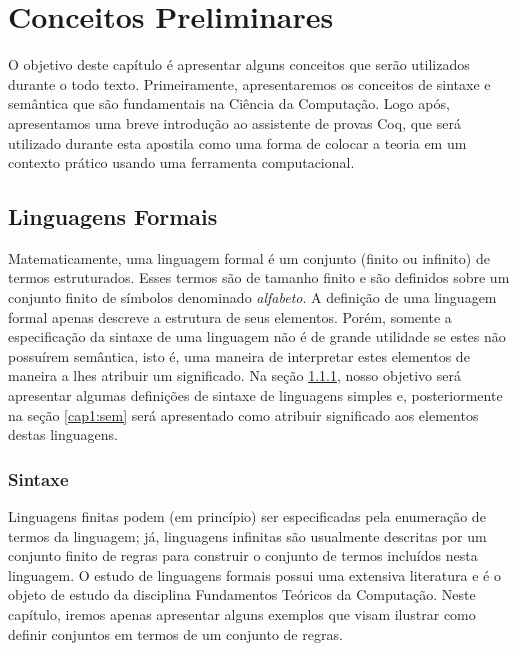 \chapter{Conceitos Preliminares}

O objetivo deste cap\'itulo \'e apresentar alguns conceitos que ser\~ao utilizados durante o todo texto. Primeiramente,
apresentaremos os conceitos de sintaxe e sem\^antica que s\~ao fundamentais na Ci\^encia da Computa\c{c}\~ao. Logo ap\'os,
apresentamos uma breve introdu\c{c}\~ao ao assistente de provas Coq, que ser\'a utilizado durante esta apostila como uma
forma de colocar a teoria em um contexto pr\'atico usando uma ferramenta computacional.

\section{Linguagens Formais}

Matematicamente, uma linguagem formal \'e um conjunto (finito ou infinito) de termos estruturados. Esses
termos s\~ao de tamanho finito e s\~ao definidos sobre um conjunto finito de s\'imbolos denominado \textit{alfabeto}.
A defini\c{c}\~ao de uma linguagem formal apenas descreve a estrutura de seus elementos. Por\'em, somente a especifica\c{c}\~ao
da sintaxe de uma linguagem n\~ao \'e de grande utilidade se estes n\~ao possu\'irem sem\^antica, isto \'e, uma maneira de
interpretar estes elementos de maneira a lhes atribuir um significado. Na se\c{c}\~ao \ref{cap1:syn}, nosso objetivo ser\'a apresentar
algumas defini\c{c}\~oes de sintaxe de linguagens simples e, posteriormente na se\c{c}\~ao \ref{cap1:sem} ser\'a apresentado como
atribuir significado aos elementos destas linguagens.

\subsection{Sintaxe}\label{cap1:syn}

Linguagens finitas podem (em princ\'ipio) ser especificadas pela enumera\c{c}\~ao de termos da linguagem; j\'a, linguagens
infinitas s\~ao usualmente descritas por um conjunto finito de regras para construir o conjunto de termos inclu\'idos nesta linguagem.
O estudo de linguagens formais possui uma extensiva literatura e \'e o objeto de estudo da disciplina Fundamentos Te\'oricos da Computa\c{c}\~ao.
Neste cap\'itulo, iremos apenas apresentar alguns exemplos que visam ilustrar como definir conjuntos em termos de um conjunto de regras.

